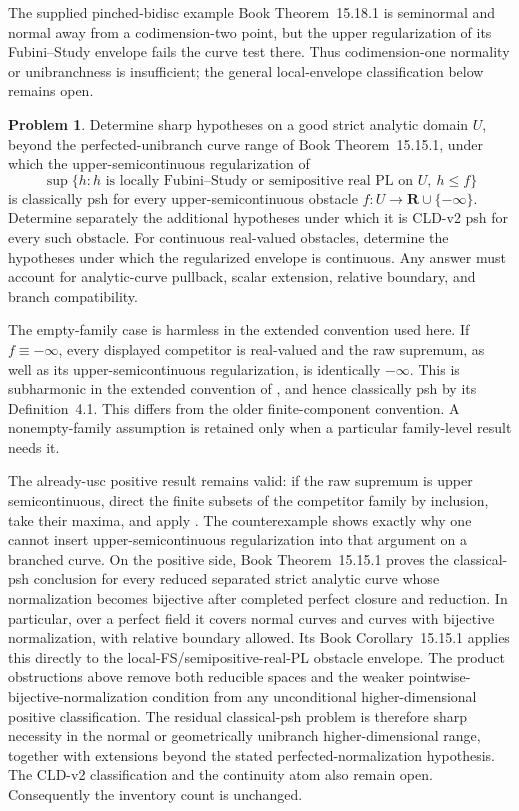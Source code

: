 \documentclass[11pt,a4paper]{article}
\theoremstyle{definition}
\newtheorem{problem}{Problem}[section]
\theoremstyle{remark}
\begin{document}
The supplied pinched-bidisc example
Book Theorem~15.18.1 is seminormal and normal
away from a codimension-two point, but the upper regularization of its
Fubini--Study envelope fails the curve test there. Thus codimension-one
normality or unibranchness is insufficient; the general local-envelope
classification below remains open.

\begin{problem}\label{prob:frontier-unibranch-local-envelope}
Determine sharp hypotheses on a good strict analytic domain \(U\), beyond
the perfected-unibranch curve range of
Book Theorem~15.15.1, under which the
upper-semicontinuous regularization of
\[
 \sup\{h:h\text{ is locally Fubini--Study or semipositive real PL on }U,
              \ h\leq f\}
\]
is classically psh for every upper-semicontinuous obstacle
\(f:U\to\mathbf R\cup\{-\infty\}\).  Determine separately the additional
hypotheses under which it is CLD-v2 psh for every such obstacle.  For
continuous real-valued obstacles, determine the hypotheses under which the
regularized envelope is continuous.  Any answer must account for
analytic-curve pullback, scalar extension, relative boundary, and branch
compatibility.
\end{problem}

The empty-family case is harmless in the extended convention used here.  If
\(f\equiv-\infty\), every displayed competitor is real-valued and the raw
supremum, as well as its upper-semicontinuous regularization, is identically
\(-\infty\).  This is subharmonic in the extended convention of
\cite[Definition~3.4 and \S3.4.1]{GR25Classical}, and hence classically psh
by its Definition~4.1.  This differs from the older finite-component
convention.  A nonempty-family assumption is retained only when a particular
family-level result needs it.

The already-usc positive result remains valid: if the raw supremum is upper
semicontinuous, direct the finite subsets of the competitor family by
inclusion, take their maxima, and apply
\cite[Theorem~6.5]{GR25Classical}.  The counterexample shows exactly why one
cannot insert upper-semicontinuous regularization into that argument on a
branched curve.  On the positive side,
Book Theorem~15.15.1 proves the classical-psh
conclusion for every reduced separated strict analytic curve whose
normalization becomes bijective after completed perfect closure and
reduction.  In particular, over a perfect field it covers normal curves and
curves with bijective normalization, with relative boundary allowed.  Its
Book Corollary~15.15.1 applies this directly
to the local-FS/semipositive-real-PL obstacle envelope.  The product
obstructions above remove both reducible spaces and the weaker
pointwise-bijective-normalization condition from any unconditional
higher-dimensional positive classification.  The residual classical-psh
problem is therefore sharp necessity in the normal or geometrically
unibranch higher-dimensional range, together with extensions beyond the
stated perfected-normalization hypothesis.  The CLD-v2 classification and
the continuity atom also remain open.  Consequently the inventory count is
unchanged.
\end{document}
